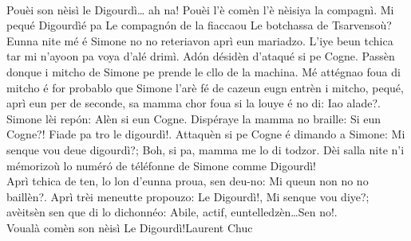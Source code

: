 {\\Pouèi son nèisì le Digourdì… ah na! Pouèi l'è comèn l'è nèisiya la compagnì. Mi pequé \og Digourdì\fg é pa \og Le compagn\'on de la fiacca\fg ou \og Le botchassa de Tsarvensoù\fg?
\\Eunna nite mé é Simone no no reteriavon aprì eun mariadzo. L'iye beun tchica tar mi n'ayoon pa voya d'alé drimì. Ad\'on désidèn d'ataqué si pe Cogne. Passèn donque i mitcho de Simone pe prende le cllo de la machina. Mé attégnao foua di mitcho é for probablo que Simone l'arè fé de cazeun eugn entrèn i mitcho, pequé, aprì eun per de seconde, sa mamma chor foua si la louye é no di: \og Iao alade?\fg. Simone lèi rep\'on: \og Alèn si eun Cogne\fg. Dispéraye la mamma no braille: \og Si eun Cogne?! Fiade pa tro le digourdì!\fg.
Attaquèn si pe Cogne é dimando a Simone: \og Mi senque vou deue digourdì?\fg; \og Boh, si pa, mamma me lo di todzor\fg. Dèi salla nite n'i mémorizoù lo numér\'o de téléfonne de Simone comme \og Digourdì\fg!
\\Aprì tchica de ten, lo lon d'eunna proua, sen deu-no: \og Mi queun non no no baillèn?\fg. Aprì trèi meneutte propouzo: \og Le Digourdì!\fg, \og Mi senque vou diye?\fg; avèitsèn sen que di lo dichonnéo: \og Abile, actif, euntelledzèn\fg\ldots \og Sen no!\fg.
\\Voualà comèn son nèisì Le Digourdì!}{Laurent Chuc}

